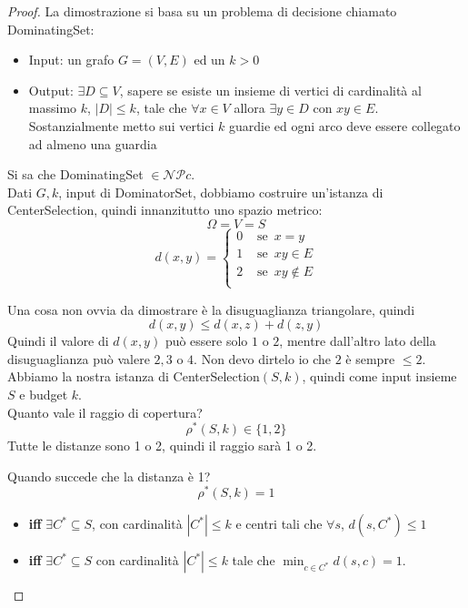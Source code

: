 \begin{proof}
	La dimostrazione si basa su un problema di decisione chiamato DominatingSet: 
	\begin{itemize}
		\item Input: un grafo $G = (V, E)$ ed un $k>0$
		\item Output: $\exists D \subseteq V$, sapere se esiste un insieme di vertici di cardinalità al massimo $k$, $|D| \leq k$, tale che $\forall x \in V$ allora $\exists y \in D$ con $xy \in E$. Sostanzialmente metto sui vertici $k$ guardie ed ogni arco deve essere collegato ad almeno una guardia
	\end{itemize}
	
	Si sa che DominatingSet $\in \mathcal{NP}c$.\\
	
	Dati $G,k$, input di DominatorSet, dobbiamo costruire un'istanza di CenterSelection, quindi innanzitutto uno spazio metrico:
	$$ \Omega = V = S $$
	$$ d (x,y) = 
	\begin{cases}
		0 & \text{ se } \, x=y \\
		1 & \text{ se } \, xy \in E \\
		2 & \text{ se } \, xy \notin E \\
	\end{cases}
	$$
	
	Una cosa non ovvia da dimostrare è la disuguaglianza triangolare, quindi 
	$$ d(x,y) \leq d(x,z) + d(z,y) $$
	Quindi il valore di $ d(x,y)$ può essere solo $1$ o $2$, mentre dall'altro lato della disuguaglianza può valere $2,3$ o $4$. Non devo dirtelo io che $2$ è sempre $\leq 2$.\\
	
	Abbiamo la nostra istanza di CenterSelection$(S,k)$, quindi come input insieme $S$ e budget $k$. \\
	
	Quanto vale il raggio di copertura?
	$$ \rho^\ast (S,k) \in \{1,2\}$$
	Tutte le distanze sono 1 o 2, quindi il raggio sarà 1 o 2.\\
	
	\newpage
	
	Quando succede che la distanza è 1? 
	$$ \rho^\ast (S,k) = 1 $$
	\begin{itemize}[label*=]
		\item \textbf{iff} $\exists C^\ast \subseteq S$, con cardinalità $|C^\ast| \leq k$ e centri tali che $\forall s$, $d(s,C^\ast) \leq 1$ \\
		
		\item \textbf{iff} $\exists C^\ast \subseteq S$ con cardinalità $|C^\ast| \leq k$ tale che $\min_{c \in C^\ast} d(s,c) = 1$.\\
		

\end{itemize}
\end{proof}
